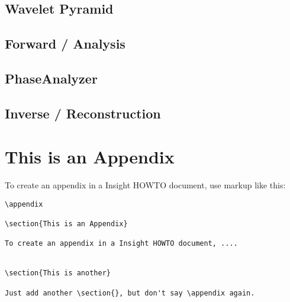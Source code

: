 \documentclass{InsightArticle}
\theoremstyle{definition}
\begin{document}
\subsection{Wavelet Pyramid}
\label{sub:Pyramid}

\subsection{Forward / Analysis}
\label{sub:Forward}

\subsection{PhaseAnalyzer}

\subsection{Inverse / Reconstruction}
\label{sub:Inverse}


\appendix

\section{This is an Appendix}

To create an appendix in a Insight HOWTO document, use markup like
this:

\begin{verbatim}
\appendix

\section{This is an Appendix}

To create an appendix in a Insight HOWTO document, ....


\section{This is another}

Just add another \section{}, but don't say \appendix again.
\end{verbatim}
\end{document}
